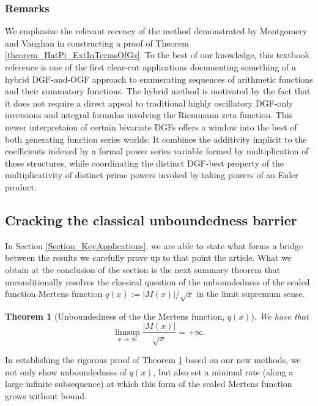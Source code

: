 \documentclass[11pt,reqno,a4letter]{article}
\numberwithin{figure}{section}
\numberwithin{table}{section}
\theoremstyle{plain}
\newtheorem{theorem}{Theorem}
\numberwithin{theorem}{section}
\theoremstyle{definition}
\begin{document}
\subsubsection{Remarks} 

We emphasize the relevant recency of the method demonstrated by 
Montgomery and Vaughan in constructing a proof of 
Theorem \ref{theorem_HatPi_ExtInTermsOfGz}. 
To the best of our knowledge, this textbook reference is 
one of the first clear-cut applications documenting something of a hybrid 
DGF-and-OGF approach to enumerating sequences of arithmetic functions 
and their summatory functions. The hybrid method is motivated by the fact that it 
does not require a direct appeal to 
traditional highly oscillatory DGF-only inversions and integral formulas 
involving the Riemmann zeta function. 
This newer interpretaion of certain bivariate DGFs 
offers a window into the best of both generating function series worlds: 
It combines the additivity 
implicit to the coefficients indexed by a formal power series variable formed by 
multiplication of these structures, while coordinating the distinct DGF-best 
property of the multiplicativity of distinct prime powers invoked 
by taking powers of an Euler product. 

\subsection{Cracking the classical unboundedness barrier} 

In Section \ref{Section_KeyApplications}, 
we are able to state what forms a bridge between the results 
we carefully prove up to that point the article. 
What we obtain at the conclusion of the section 
is the next summary theorem that unconditionally 
resolves the classical question of the 
unboundedness of the scaled function Mertens function 
$q(x) := |M(x)| / \sqrt{x}$ in the limit supremum sense. 

\begin{theorem}[Unboundedness of the the Mertens function, $q(x)$] 
\label{cor_ThePipeDreamResult_v1} 
We have that 
\[
\limsup_{x \rightarrow \infty} \frac{|M(x)|}{\sqrt{x}} = +\infty. 
\]
\end{theorem} 

In establishing the rigorous proof of 
Theorem \ref{cor_ThePipeDreamResult_v1} 
based on our new methods, we not only show unboundedness of 
$q(x)$, but also set a minimal rate (along a large infinite subsequence) 
at which this form of the 
scaled Mertens function grows without bound. 
\end{document}
